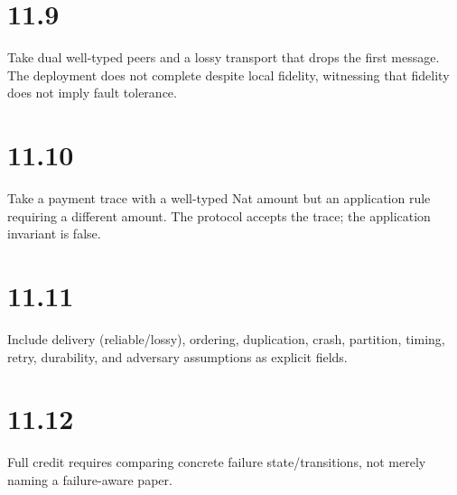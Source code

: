 \section*{11.9}
Take dual well-typed peers and a lossy transport that drops the first message. The deployment does not complete despite local fidelity, witnessing that fidelity does not imply fault tolerance.

\section*{11.10}
Take a payment trace with a well-typed Nat amount but an application rule requiring a different amount. The protocol accepts the trace; the application invariant is false.

\section*{11.11}
Include delivery (reliable/lossy), ordering, duplication, crash, partition, timing, retry, durability, and adversary assumptions as explicit fields.

\section*{11.12}
Full credit requires comparing concrete failure state/transitions, not merely naming a failure-aware paper.
